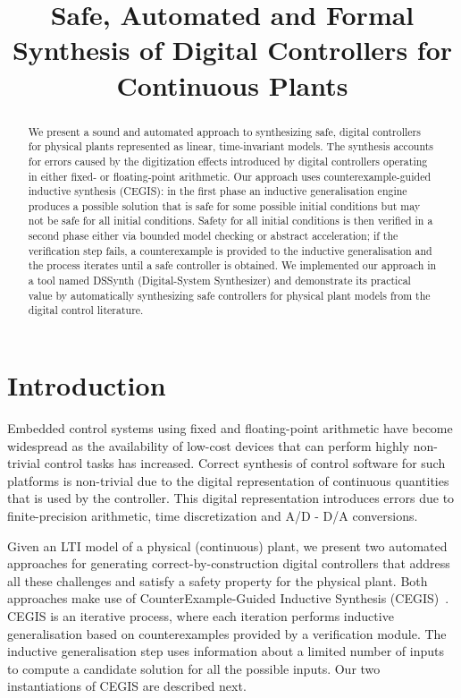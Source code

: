 \documentclass[submission]{eptcs}
\title{Safe, Automated and Formal Synthesis of Digital Controllers 
for Continuous Plants}
\begin{document}
\maketitle

\begin{abstract}
We present a sound and automated approach to synthesizing safe,
digital controllers for physical plants represented as linear,
time-invariant models. The synthesis
accounts for errors caused by the digitization effects introduced by
digital controllers operating in either fixed- or floating-point arithmetic. 
Our approach uses counterexample-guided inductive
synthesis (CEGIS): in the first phase an inductive generalisation engine produces a
possible solution that is safe for some possible initial conditions but may
not be safe for all initial conditions. Safety for all initial conditions
is then verified in a second phase either
via bounded model checking or abstract acceleration; if the verification step fails, a
counterexample is provided to the inductive generalisation and the
process iterates until a safe controller is obtained.  We implemented our approach
in a tool named DSSynth (Digital-System Synthesizer) and demonstrate
its practical value by automatically synthesizing safe controllers for physical 
plant models from the digital control literature.
\end{abstract}

\section{Introduction}

Embedded control systems using fixed and floating-point arithmetic 
have become widespread
as the availability of low-cost devices that can perform highly
non-trivial control tasks has increased. Correct synthesis of
control software for such platforms is non-trivial due to the digital representation of continuous quantities 
that is used by the controller. This digital representation introduces 
errors due to finite-precision arithmetic, time discretization and 
A/D - D/A conversions.


%
Given an LTI model of a physical (continuous) plant, we present two automated approaches for generating
correct-by-construction digital controllers that address all these
challenges and satisfy a safety property for the physical plant. 
Both approaches make use of CounterExample-Guided
Inductive Synthesis (CEGIS)~\cite{jha-icse10,
  DBLP:conf/asplos/Solar-LezamaTBSS06}.  CEGIS is an
iterative process, where each iteration performs inductive
generalisation based on counterexamples provided by a verification module. 
The inductive generalisation step uses information 
about a limited number of inputs to compute a candidate solution
for all the possible inputs. Our two instantiations of CEGIS are
described next.
\end{document}

